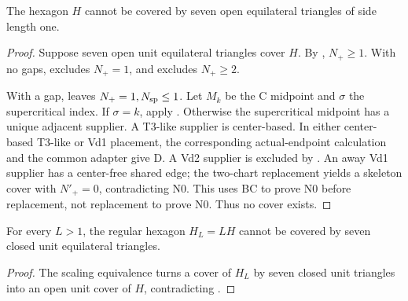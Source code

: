 \begin{theorem}
\label{thm:main}
The hexagon $H$ cannot be covered by seven open equilateral triangles of side
length one.
\end{theorem}
\begin{proof}
Suppose seven open unit equilateral triangles cover $H$.
By , $N_+\ge1$.
With no gaps,  excludes $N_+=1$,
and  excludes $N_+\ge2$.

With a gap,  leaves $N_+=1,N_{\rm sp}\le1$.
Let $M_k$ be the C midpoint and $\sigma$ the supercritical index.
If $\sigma=k$, apply .
Otherwise the supercritical midpoint has a unique adjacent supplier.
A T3-like supplier is center-based. In either center-based T3-like or
Vd1 placement, the corresponding actual-endpoint calculation
and the common adapter  give D.
A Vd2 supplier is excluded by .
An away Vd1 supplier has a center-free shared edge; the two-chart
replacement  yields a
skeleton cover with $N'_+=0$, contradicting N0. This uses BC to prove
N0 before replacement, not replacement to prove N0.
Thus no cover exists.
\end{proof}

\begin{corollary}
\label{cor:expanded-closed}
For every $L>1$, the regular hexagon $H_L=LH$ cannot be covered by seven closed
unit equilateral triangles.
\end{corollary}
\begin{proof}
The scaling equivalence  turns a cover of $H_L$
by seven closed unit triangles into an open unit cover of $H$, contradicting
.
\end{proof}

